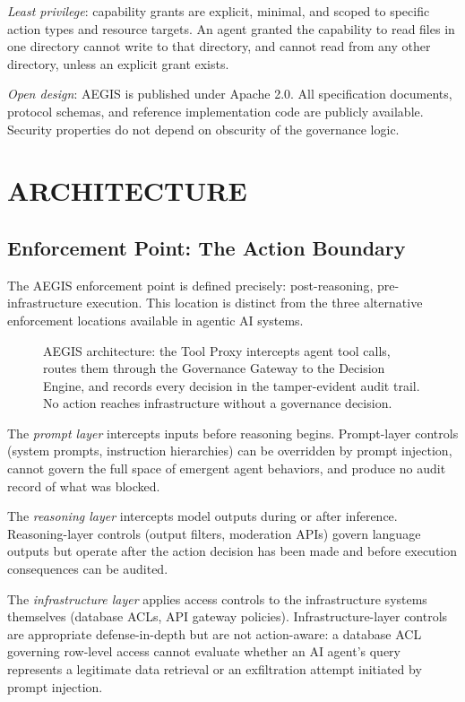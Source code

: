 \documentclass{IEEEcsmag}
\begin{document}
{\it Least privilege}: capability grants are explicit, minimal, and scoped to specific action types and resource targets. An agent granted the capability to read files in one directory cannot write to that directory, and cannot read from any other directory, unless an explicit grant exists.

{\it Open design}: AEGIS is published under Apache 2.0. All specification documents, protocol schemas, and reference implementation code are publicly available. Security properties do not depend on obscurity of the governance logic.

\section{ARCHITECTURE}

\subsection{Enforcement Point: The Action Boundary}

The AEGIS enforcement point is defined precisely: post-reasoning, pre-infrastructure execution. This location is distinct from the three alternative enforcement locations available in agentic AI systems.

\begin{figure}[!t]
\centering
\caption{AEGIS architecture: the Tool Proxy intercepts agent tool calls, routes them through the Governance Gateway to the Decision Engine, and records every decision in the tamper-evident audit trail. No action reaches infrastructure without a governance decision.}
\label{fig:architecture}
\end{figure}

The {\it prompt layer} intercepts inputs before reasoning begins. Prompt-layer controls (system prompts, instruction hierarchies) can be overridden by prompt injection, cannot govern the full space of emergent agent behaviors, and produce no audit record of what was blocked.

The {\it reasoning layer} intercepts model outputs during or after inference. Reasoning-layer controls (output filters, moderation APIs) govern language outputs but operate after the action decision has been made and before execution consequences can be audited.

The {\it infrastructure layer} applies access controls to the infrastructure systems themselves (database ACLs, API gateway policies). Infrastructure-layer controls are appropriate defense-in-depth but are not action-aware: a database ACL governing row-level access cannot evaluate whether an AI agent's query represents a legitimate data retrieval or an exfiltration attempt initiated by prompt injection.
\end{document}
